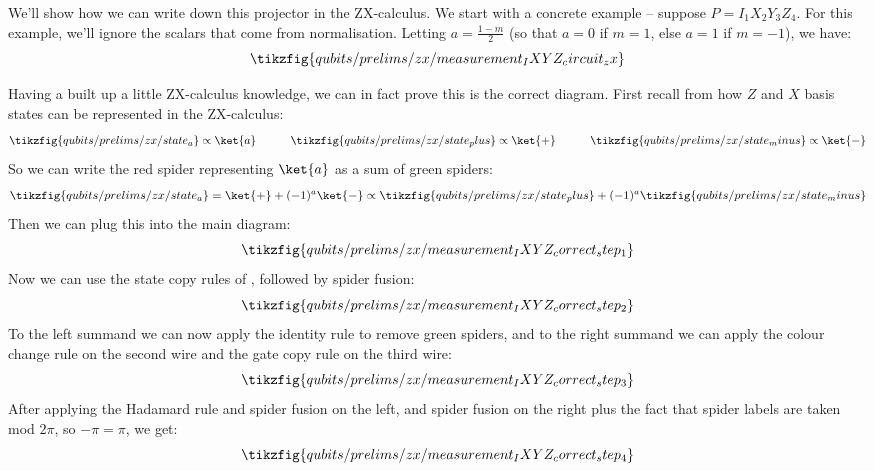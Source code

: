 We'll show how we can write down this projector in the ZX-calculus.
We start with a concrete example -- suppose $P = I_1 X_2 Y_3 Z_4$.
For this example, we'll ignore the scalars that come from normalisation.
Letting $a = \frac{1 - m}{2}$ (so that $a = 0$ if $m = 1$, else $a = 1$ if $m = -1$), we have:
\begin{equation}
    \tikzfig{qubits/prelims/zx/measurement_IXYZ_circuit_zx}
\end{equation}

Having a built up a little ZX-calculus knowledge, we can in fact prove this is the correct diagram.
First recall from  how $Z$ and $X$ basis states can be represented in the ZX-calculus:
\begin{equation}
    \tikzfig{qubits/prelims/zx/state_a} \propto \ket{a}
    \qqquad
    \tikzfig{qubits/prelims/zx/state_plus} \propto \ket{+}
    \qqquad
    \tikzfig{qubits/prelims/zx/state_minus} \propto \ket{-}
\end{equation}
So we can write the red spider representing $\ket{a}$ as a sum of green spiders:
\begin{equation}
    \tikzfig{qubits/prelims/zx/state_a}
    = \ket{+} + (-1)^a\ket{-}
    \propto \tikzfig{qubits/prelims/zx/state_plus} + (-1)^a\tikzfig{qubits/prelims/zx/state_minus}
\end{equation}
Then we can plug this into the main diagram:
\begin{equation}
    \tikzfig{qubits/prelims/zx/measurement_IXYZ_correct_step_1}
\end{equation}
Now we can use the state copy rules of , followed by spider fusion:
\begin{equation}
    \tikzfig{qubits/prelims/zx/measurement_IXYZ_correct_step_2}
\end{equation}
To the left summand we can now apply the identity rule to remove green spiders, and to the right summand we can apply the colour change rule on the second wire and the gate copy rule on the third wire:
\begin{equation}
    \tikzfig{qubits/prelims/zx/measurement_IXYZ_correct_step_3}
\end{equation}
After applying the Hadamard rule and spider fusion on the left, and spider fusion on the right plus the fact that spider labels are taken mod $2\pi$, so $-\pi = \pi$, we get:
\begin{equation}
    \tikzfig{qubits/prelims/zx/measurement_IXYZ_correct_step_4}
\end{equation}
